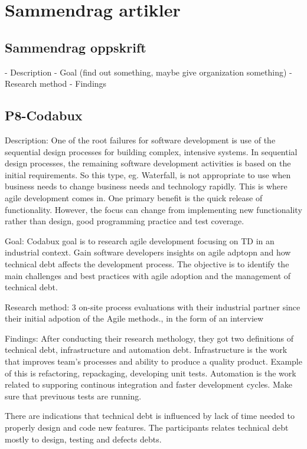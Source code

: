 \chapter{Sammendrag artikler}
\section{Sammendrag oppskrift}
- Description
- Goal (find out something, maybe give organization something)
- Research method
- Findings

\section{P8-Codabux}
Description: One of the root failures for software development is use of the sequential design processes for building complex, intensive systems. In sequential design processes, the remaining software development activities is based on the initial requirements. So this type, eg. Waterfall, is not appropriate to use when business needs to change business needs and technology rapidly. This is where agile development comes in. One primary benefit is the quick release of functionality. However, the focus can change from implementing new functionality rather than design, good programming practice and test coverage.

Goal: Codabux goal is to research agile development focusing on TD in an industrial context. Gain software developers insights on agile adptopn and how technical debt affects the development process. The objective is to identify the main challenges and best practices with agile adoption and the management of technical debt.

Research method: 3 on-site process evaluations with their industrial partner since their initial adpotion of the Agile methods., in the form of an interview

Findings: After conducting their research methology, they got two definitions of technical debt, infrastructure and automation debt. Infrastructure is the work that improves team's processes and ability to produce a quality product. Example of this is refactoring, repackaging, developing unit tests. Automation is the work related to supporing continous integration and faster development cycles. Make sure that previuous tests are running.

There are indications that technical debt is influenced by lack of time needed to properly design and code new features. The participants relates technical debt mostly to design, testing and defects debts.

